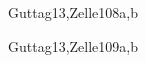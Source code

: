 \begin{syllabus}
\begin{unit}{\ALFundamentalDataStructuresandAlgorithms}{}{Guttag13,Zelle10}{8}{a,b}
    \begin{learningoutcomes}
        \item \ALFundamentalDataStructuresandAlgorithmsLOImplement [\Usage] 
        \item \ALFundamentalDataStructuresandAlgorithmsLOImplementSimple [\Assessment] 
        \item \ALFundamentalDataStructuresandAlgorithmsLOBe [\Usage] 
        \item \ALFundamentalDataStructuresandAlgorithmsLODescribeTheHash [\Familiarity] 
        \item \ALFundamentalDataStructuresandAlgorithmsLODiscuss [\Familiarity]
        \item \ALFundamentalDataStructuresandAlgorithmsLODiscussFactors [\Familiarity]
        \item \ALFundamentalDataStructuresandAlgorithmsLOExplainHow [\Familiarity] 
        \item \ALFundamentalDataStructuresandAlgorithmsLOSolveProblems [\Usage] 
        \item \ALFundamentalDataStructuresandAlgorithmsLODemonstrate [\Assessment] 
        \item \ALFundamentalDataStructuresandAlgorithmsLODescribeTheAnd [\Familiarity]
        \item \ALFundamentalDataStructuresandAlgorithmsLOSolveProblemsAlgorithms [\Usage] 
        \item \ALFundamentalDataStructuresandAlgorithmsLOTrace [\Usage] 
    \end{learningoutcomes}
\end{unit}

\begin{unit}{\SDFAlgorithmsandDesign}{}{Guttag13,Zelle10}{9}{a,b}
    \begin{topics}
        \item \SDFAlgorithmsandDesignTopicThe
        \item \SDFAlgorithmsandDesignTopicTheRole
        \item \SDFAlgorithmsandDesignTopicProblem
        \item \SDFAlgorithmsandDesignTopicFundamental
    \end{topics}


\end{unit}
\end{syllabus}
